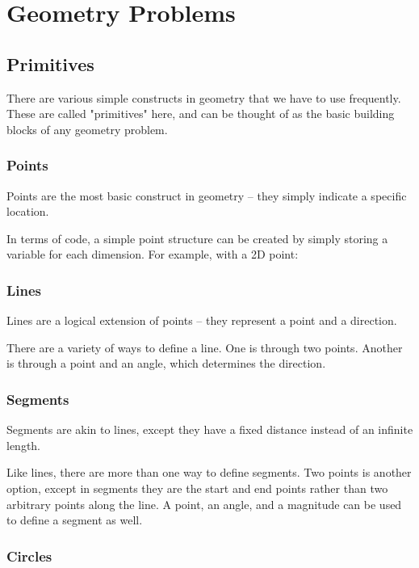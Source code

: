 \section{Geometry Problems}

\subsection{Primitives}

There are various simple constructs in geometry that we have to use frequently. These are called "primitives" here, and can be thought of as the basic building blocks of any geometry problem.

\subsubsection{Points}

Points are the most basic construct in geometry -- they simply indicate a specific location.

In terms of code, a simple point structure can be created by simply storing a variable for each dimension. For example, with a 2D point:


\subsubsection{Lines}

Lines are a logical extension of points -- they represent a point and a direction.

There are a variety of ways to define a line. One is through two points. Another is through a point and an angle, which determines the direction.

\subsubsection{Segments}

Segments are akin to lines, except they have a fixed distance instead of an infinite length.

Like lines, there are more than one way to define segments. Two points is another option, except in segments they are the start and end points rather than two arbitrary points along the line. A point, an angle, and a magnitude can be used to define a segment as well.

\subsubsection{Circles}

